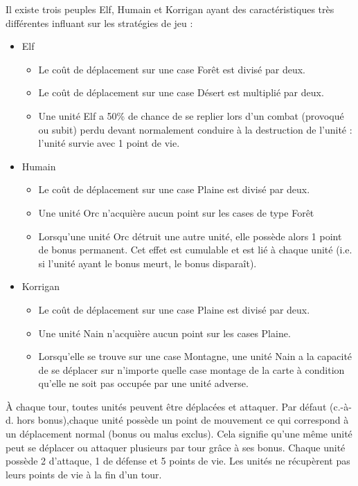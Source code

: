 	Il existe trois peuples Elf, Humain et Korrigan ayant des caractéristiques très différentes influant sur les
	stratégies de jeu :
	\begin{itemize}
		\item Elf
		\begin{itemize}
			\item Le coût de déplacement sur une case Forêt est divisé par deux. 
			\item Le coût de déplacement sur une case Désert est multiplié par deux.
			\item Une unité Elf a 50\% de chance de se replier lors d’un combat (provoqué ou subit) perdu devant normalement conduire à la destruction de l’unité : l’unité survie avec 1 point de 	vie.
		\end{itemize}
		\item Humain
		\begin{itemize}
			\item Le coût de déplacement sur une case Plaine est divisé par deux.
			\item Une unité Orc n’acquière aucun point sur les cases de type Forêt
			\item Lorsqu’une unité Orc détruit une autre unité, elle possède alors 1 point de bonus permanent. Cet effet est cumulable et est lié à chaque unité (i.e. si l’unité ayant le bonus meurt, le bonus disparaît).
		\end{itemize}
		\item Korrigan
		\begin{itemize}
			\item Le coût de déplacement sur une case Plaine est divisé par deux.
			\item Une unité Nain n’acquière aucun point sur les cases Plaine.
			\item Lorsqu’elle se trouve sur une case Montagne, une unité Nain a la capacité de se déplacer sur n’importe quelle case montage de la carte à condition qu’elle ne soit pas occupée par une unité adverse.
		\end{itemize}
	\end{itemize}

	À chaque tour, toutes unités peuvent être déplacées et attaquer. Par défaut (c.-à-d. hors bonus),chaque unité possède un point de mouvement ce qui correspond à un déplacement normal (bonus ou malus 	exclus). Cela signifie qu’une même unité peut se déplacer ou attaquer plusieurs par tour grâce à ses bonus. Chaque unité possède 2 d’attaque, 1 de défense et 5 points de vie. Les unités ne récupèrent pas leurs points de vie à la fin d’un tour.


